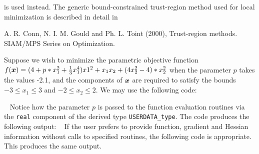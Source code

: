 \documentclass{galahad}
\begin{document}
\noindent
is used instead. The generic bound-constrained trust-region method used 
for local minimization is described in detail in
\vspace*{1mm}

\noindent
A. R. Conn, N. I. M. Gould and Ph. L. Toint (2000),
Trust-region methods.
SIAM/MPS Series on Optimization.

\noindent



\galexamples
Suppose we wish to minimize the parametric objective function
$f({\bm{x}}) = ( 4 + p * x_1^2 + \frac{1}{3} x_1^4 ) x1^2
                 + x_1 x_2 + ( 4 x_2^2 - 4 ) * x_2^2$
when the parameter $p$ takes the values -2.1,
and the components of ${\bm{x}}$ are required to satisfy the
bounds $-3 \leq x_1 \leq 3$ and $-2 \leq x_2 \leq 2$.
We may use the following code:

{\tt \small
\VerbatimInput{\packageexample}
}
\noindent
Notice how the parameter $p$ is passed to the function 
evaluation routines via the {\tt real} component of the derived type 
{\tt USERDATA\_type}.
The code produces the following output:
{\tt \small
\VerbatimInput{\packageresults}
}
\noindent
If the user prefers to provide function, gradient and Hessian information
without calls to specified routines, the following code is appropriate.
{\tt \small
\VerbatimInput{\packageexampleb}
}
\noindent
This produces the same output.
\end{document}
